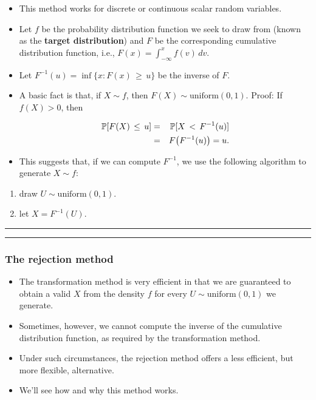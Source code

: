 \documentclass[]{article}
\begin{document}
\begin{itemize}
\item
  This method works for discrete or continuous scalar random variables.
\item
  Let \(f\) be the probability distribution function we seek to draw
  from (known as the \textbf{target distribution}) and \(F\) be the
  corresponding cumulative distribution function, i.e.,
  \(F(x) = \int_{-\infty}^x f(v)\, dv\).
\item
  Let \(F^{-1}(u) = \inf\{x: F(x)\,\ge\,u\}\) be the inverse of \(F\).
\item
  A basic fact is that, if \(X\!\sim\!f\), then
  \(F(X)\!\sim\!\mathrm{uniform}(0,1)\). Proof: If \(f(X)>0\), then

  \begin{eqnarray}
  \mathbb{P}[F(X)\,\le\,u] &=& \mathbb{P}[X\,<\,F^{-1}(u)] 
  \\
  &=& F\big(F^{-1}(u)\big) = u.
  \end{eqnarray}
\item
  This suggests that, if we can compute \(F^{-1}\), we use the following
  algorithm to generate \(X\!\sim\!f\):
\end{itemize}

\begin{enumerate}
\def\labelenumi{\arabic{enumi}.}
\item
  draw \(U \sim \mathrm{uniform}(0,1)\).
\item
  let \(X = F^{-1}(U)\).
\end{enumerate}

\begin{center}\rule{0.5\linewidth}{\linethickness}\end{center}

\begin{center}\rule{0.5\linewidth}{\linethickness}\end{center}

\subsubsection{The rejection method}\label{the-rejection-method}

\begin{itemize}
\item
  The transformation method is very efficient in that we are guaranteed
  to obtain a valid \(X\) from the density \(f\) for every
  \(U \sim \mathrm{uniform}(0,1)\) we generate.
\item
  Sometimes, however, we cannot compute the inverse of the cumulative
  distribution function, as required by the transformation method.
\item
  Under such circumstances, the rejection method offers a less
  efficient, but more flexible, alternative.
\item
  We'll see how and why this method works.
\end{itemize}
\end{document}
